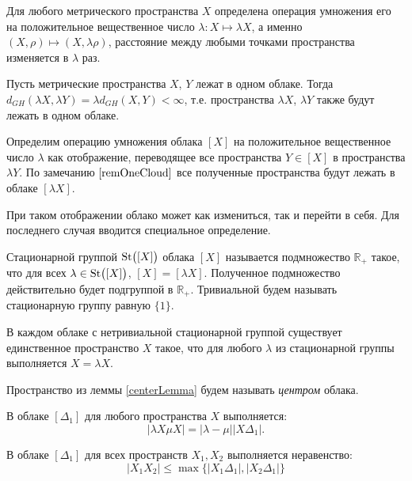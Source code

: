 Для любого метрического пространства $X$ определена операция умножения его
на положительное вещественное число $\lambda\colon X\mapsto \lambda X$, а именно
$(X, \rho) \mapsto (X, \lambda \rho)$, расстояние между любыми точками
пространства изменяется в $\lambda$ раз.
\begin{remark} Пусть метрические
	пространства $X$, $Y$ лежат в одном облаке. Тогда
	$d_{GH}(\lambda X, \lambda Y) = \lambda d_{GH}(X,Y) < \infty$, т.е. пространства
	$\lambda X$, $\lambda Y$ также будут лежать в одном облаке.
	\label{remOneCloud}
\end{remark}
\begin{defin}Определим операцию умножения облака $[X]$ на положительное вещественное
	число $\lambda$ как отображение, переводящее все пространства $Y \in [X]$ в
	пространства $\lambda Y$. По замечанию $\ref{remOneCloud}$ все полученные пространства будут
	лежать в облаке $[\lambda X]$.
\end{defin} 
При таком отображении облако может как
измениться, так и перейти в себя. Для последнего случая вводится специальное
определение.
\begin{defin}
	Стационарной группой $\operatorname{St}\bigl([X]\bigr)$ облака $[X]$
	называется подмножество $\mathbb{R}_+$ такое, что для всех
	$\lambda \in \operatorname{St}\bigl([X]\bigr)$, $[X] = [\lambda X]$. Полученное подмножество
	действительно будет подгруппой в $\mathbb{R}_+$. Тривиальной
	будем называть стационарную группу равную $\{1\}$.
\end{defin}


\begin{lemma}
	В каждом облаке с нетривиальной стационарной группой существует единственное
	пространство $X$ такое, что для любого $\lambda$ из стационарной группы
	выполняется $X = \lambda X$.
	\label{centerLemma}
\end{lemma}
\begin{defin}
	Пространство из леммы \ref{centerLemma} будем называть \emph{центром} облака.
\end{defin}
\begin{remark} В
	облаке $[\Delta_1]$ для любого пространства $X$ выполняется:
	$$|\lambda X \mu X| = |\lambda - \mu||X\Delta_1|.$$
\end{remark} \begin{remark} В облаке
	$[\Delta_{1}]$ для всех пространств $X_{1}, X_{2}$ выполняется неравенство:
	$$|X_{1}X_{2}| \le \max\big\{|X_{1} \Delta_{1}|,|X_{2}\Delta_{1}|\big\}$$
	\label{remUltraMetric}
\end{remark}
